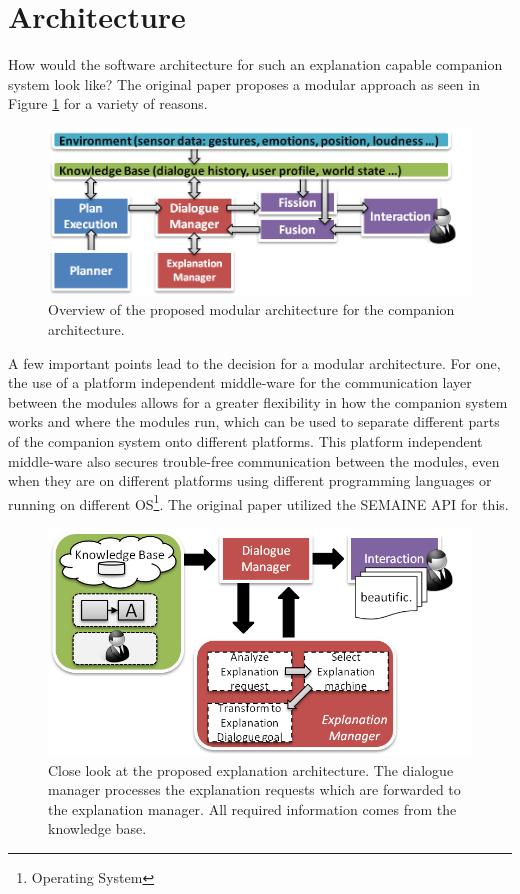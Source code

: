 \documentclass[a4paper]{article}
\begin{document}
\section{Architecture}

How would the software architecture for such an explanation capable companion system look like? The original paper proposes a modular approach as seen in Figure \ref{fig:architecture} for a variety of reasons.

\begin{figure}[H]
	\centering
	\includegraphics[width=12cm]{arch.png}
	\caption{Overview of the proposed modular architecture for the companion architecture.}
	\label{fig:architecture}
\end{figure}

A few important points lead to the decision for a modular architecture. For one, the use of a platform independent middle-ware for the communication layer between the modules allows for a greater flexibility in how the companion system works and where the modules run, which can be used to separate different parts of the companion system onto different platforms. This platform independent middle-ware also secures trouble-free communication between the modules, even when they are on different platforms using different programming languages or running on different OS\footnote{Operating System}. The original paper utilized the SEMAINE API for this.\cite{schroder2010semaine}

\begin{figure}[H]
	\centering
	\includegraphics[width=12cm]{expl_arch.png}
	\caption{Close look at the proposed explanation architecture. The dialogue manager processes the explanation requests which are forwarded to the explanation manager. All required information comes from the knowledge base.}
	\label{fig:expl_architecture}
\end{figure}
\end{document}
